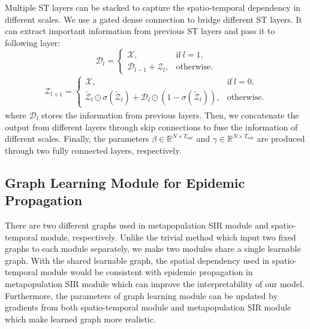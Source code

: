 \documentclass[lettersize,journal]{IEEEtran}
\begin{document}
Multiple ST layers can be stacked to capture the spatio-temporal dependency in different scales. We use a gated dense connection to bridge different ST layers. It can extract important information from previous ST layers and pass it to following layer:
\begin{equation}
    \mathcal{D}_{l} = 
    \begin{cases}
        \mathcal{X}, &\text{if}\ l = 1,\\
        \mathcal{D}_{l-1} + \mathcal{Z}_{l}, & \text{otherwise}. 
    \end{cases}
\end{equation}
\begin{align}
    \mathcal{Z}_{l+1} = \begin{cases}
        \mathcal{X}, & \text{if}\ l = 0,\\
        \tilde{\mathcal{Z}}_{l} \odot \sigma(\tilde{\mathcal{Z}}_{l})+ \mathcal{D}_{l} \odot (1 - \sigma(\tilde{\mathcal{Z}}_{l})), & \text{otherwise}. 
        \end{cases}
\end{align}
where $\mathcal{D}_{l}$ stores the information from previous layers. Then, we concatenate the output from different layers through skip connections to fuse the information of different scales. Finally, the parameters $\beta\in \mathbb{R}^{N \times T_{out}}$ and $\gamma\in \mathbb{R}^{N \times T_{out}}$ are produced through two fully connected layers, respectively. 

\subsection{Graph Learning Module for Epidemic Propagation}
There are two different graphs used in metapopulation SIR module and spatio-temporal module, respectively. Unlike the trivial method which input two fixed graphs to each module separately, we make two modules share a single learnable graph. With the shared learnable graph, the spatial dependency used in spatio-temporal module would be consistent with epidemic propagation in metapopulation SIR module which can improve the interpretability of our model. Furthermore, the parameters of graph learning module can be updated by gradients from both spatio-temporal module and metapopulation SIR module which make learned graph more realistic.
\end{document}
